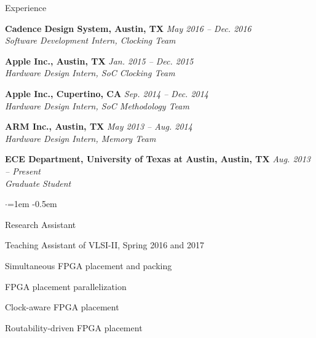 
\begin{rSection}{Experience}

    
{\bf Cadence Design System, Austin, TX} \hfill {\em May 2016 -- Dec. 2016} \\
\textit{Software Development Intern, Clocking Team}

{\bf Apple Inc., Austin, TX} \hfill {\em Jan. 2015 -- Dec. 2015} \\
\textit{Hardware Design Intern, SoC Clocking Team}

{\bf Apple Inc., Cupertino, CA} \hfill {\em Sep. 2014 -- Dec. 2014} \\
\textit{Hardware Design Intern, SoC Methodology Team}

{\bf ARM Inc., Austin, TX} \hfill {\em May 2013 -- Aug. 2014} \\
\textit{Hardware Design Intern, Memory Team}

{\bf ECE Department, University of Texas at Austin, Austin, TX} \hfill {\em Aug. 2013 -- Present} \\
\textit{Graduate Student}
\begin{list}{$\cdot$}{\leftmargin=1em} %
\itemsep -0.5em \vspace{-0.5em} %
\item Research Assistant
\item Teaching Assistant of VLSI-II, Spring 2016 and 2017
\item Simultaneous FPGA placement and packing
\item FPGA placement parallelization
\item Clock-aware FPGA placement
\item Routability-driven FPGA placement
\end{list}

\end{rSection}


